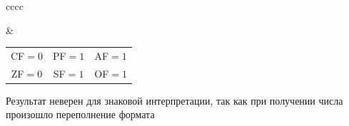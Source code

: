 \documentclass[12pt,a4paper]{report}
\begin{document}
\begin{tabular}{cccc}
 &
    \begin{tabular}{ccc}
    CF$=0$ & PF$=1$ & AF$=1$\\
    ZF$=0$ & SF$=1$ & OF$=1$
    \end{tabular}
\end{tabular}
\hfill\break
Результат неверен для знаковой интерпретации, так как при получении числа произошло переполнение формата\\
\end{document}
